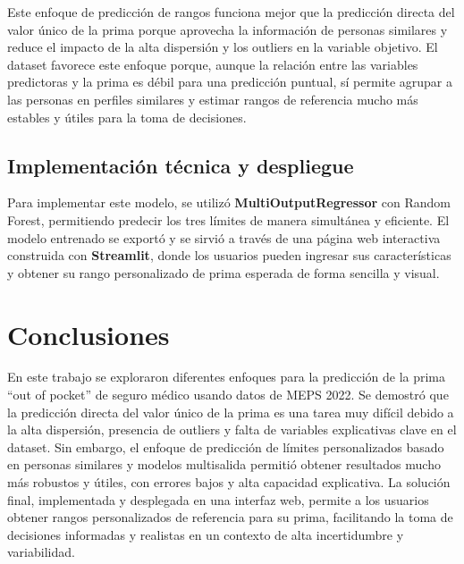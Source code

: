 \documentclass[12pt]{article}
\begin{document}
Este enfoque de predicción de rangos funciona mejor que la predicción directa del valor único de la prima porque aprovecha la información de personas similares y reduce el impacto de la alta dispersión y los outliers en la variable objetivo. El dataset favorece este enfoque porque, aunque la relación entre las variables predictoras y la prima es débil para una predicción puntual, sí permite agrupar a las personas en perfiles similares y estimar rangos de referencia mucho más estables y útiles para la toma de decisiones.

\subsection*{Implementación técnica y despliegue}
Para implementar este modelo, se utilizó \textbf{MultiOutputRegressor} con Random Forest, permitiendo predecir los tres límites de manera simultánea y eficiente. El modelo entrenado se exportó y se sirvió a través de una página web interactiva construida con \textbf{Streamlit}, donde los usuarios pueden ingresar sus características y obtener su rango personalizado de prima esperada de forma sencilla y visual.

\section{Conclusiones}
En este trabajo se exploraron diferentes enfoques para la predicción de la prima “out of pocket” de seguro médico usando datos de MEPS 2022. Se demostró que la predicción directa del valor único de la prima es una tarea muy difícil debido a la alta dispersión, presencia de outliers y falta de variables explicativas clave en el dataset. Sin embargo, el enfoque de predicción de límites personalizados basado en personas similares y modelos multisalida permitió obtener resultados mucho más robustos y útiles, con errores bajos y alta capacidad explicativa. La solución final, implementada y desplegada en una interfaz web, permite a los usuarios obtener rangos personalizados de referencia para su prima, facilitando la toma de decisiones informadas y realistas en un contexto de alta incertidumbre y variabilidad.
\end{document}
